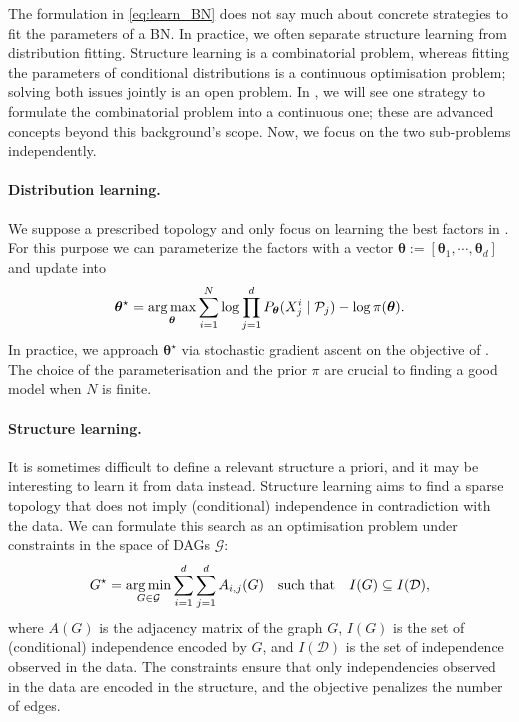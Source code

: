 The formulation in \ref{eq:learn_BN} does not say much about concrete strategies to fit the parameters of a BN. In practice, we often separate structure learning from distribution fitting. Structure learning is a combinatorial problem, whereas fitting the parameters of conditional distributions is a continuous optimisation problem; solving both issues jointly is an open problem. In , we will see one strategy to formulate the combinatorial problem into a continuous one; these are advanced concepts beyond this background's scope. Now, we focus on the two sub-problems independently.

\paragraph{Distribution learning.}
We suppose a prescribed topology and only focus on learning the best factors in . For this purpose we can parameterize the factors with a vector $\bm \theta := \left[\bm{\theta}_1, \cdots, \bm{\theta}_d\right]$ and update  into
\begin{align}
  {\bm \theta}^\star  = \operatorname*{arg\,max}_{\bm \theta} \sum_{i=1}^N \log \prod^d_{j=1}P_{\bm \theta}(X_j^i\mid \mathcal{P}_j) - \log \pi(\bm \theta).
 \label{eq:learn_factors}
\end{align}
In practice, we approach ${\bm \theta}^\star$ via stochastic gradient ascent on the objective of .
The choice of the parameterisation and the prior $\pi$ are crucial to finding a good model when $N$ is finite.

\paragraph{Structure learning.}
It is sometimes difficult to define a relevant structure a priori, and it may be interesting to learn it from data instead. Structure learning aims to find a sparse topology that does not imply (conditional) independence in contradiction with the data. We can formulate this search as an optimisation problem under constraints in the space of DAGs $\mathcal{G}$:
\begin{align}
 G^\star = \operatorname*{arg\,min}_{G \in \mathcal{G}} \sum_{i=1}^d\sum_{j=1}^d A_{i,j}(G) \quad \text{such that} \quad I(G) \subseteq I(\mathcal{D}), \label{eq:learn_structure}
\end{align}
where $A(G)$ is the adjacency matrix of the graph $G$, $I(G)$ is the set of (conditional) independence encoded by $G$, and $I(\mathcal{D})$ is the set of independence observed in the data. The constraints ensure that only independencies observed in the data are encoded in the structure, and the objective penalizes the number of edges.

